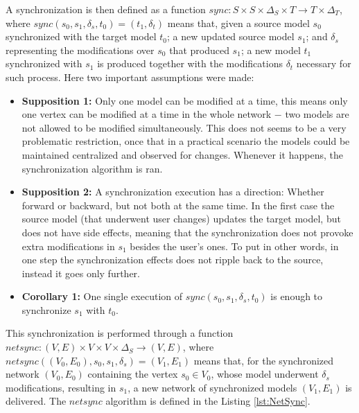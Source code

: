 \documentclass[tuberlin,cic,tc,english,noabntcite]{iiufrgs}
\begin{document}
A synchronization is then defined as a function $sync: S \times S \times \Delta_S \times T \rightarrow T \times \Delta_T$, where $sync (s_0, s_1, \delta_s, t_0) = (t_1, \delta_t)$ means that, given a source model $s_0$ synchronized with the target model $t_0$; a new updated source model $s_1$; and $\delta_s$ representing the modifications over $s_0$ that produced $s_1$; a new model $t_1$ synchronized with $s_1$ is produced together with the modifications $\delta_t$ necessary for such process. Here two important assumptions were made:

\begin{itemize}
\item \textbf{Supposition 1:} Only one model can be modified at a time, this means only one vertex can be modified at a time in the whole network $-$ two models are not allowed to be modified simultaneously. This does not seems to be a very problematic restriction, once that in a practical scenario the models could be maintained centralized and observed for changes. Whenever it happens, the synchronization algorithm is ran. 

\item \textbf{Supposition 2:} A synchronization execution has a direction: Whether forward or backward, but not both at the same time. In the first case the source model (that underwent user changes) updates the target model, but does not have side effects, meaning that the synchronization does not provoke extra modifications in $s_1$ besides the user's ones. To put in other words, in one step the synchronization effects does not ripple back to the source, instead it goes only further.

\item \textbf{Corollary 1:} One single execution of $sync (s_0, s_1, \delta_s, t_0)$ is enough to synchronize $s_1$ with $t_0$.
\end{itemize}

This synchronization is performed through a function $netsync: (V,E) \times V \times V \times \Delta_S \rightarrow (V,E)$, where $netsync ((V_0,E_0), s_0, s_1, \delta_s) = (V_1,E_1)$ means that, for the synchronized network $(V_0,E_0)$ containing the vertex $s_0 \in V_0$, whose model underwent $\delta_s$ modifications, resulting in $s_1$, a new network of synchronized models $(V_1,E_1)$ is delivered. The $netsync$ algorithm is defined in the Listing \ref{lst:NetSync}.



\end{document}
